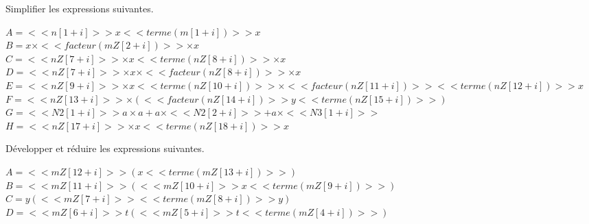\begin{multicols}{2}
\begin{center}
\medskip
{}
\end{center}


Simplifier les expressions suivantes.

\begin{multicols}{2}
$A=<<n[1+i]>> x <<terme(m[1+i])>> x$\\
$B=x\times <<facteur(mZ[2+i])>> \times x$\\
$C=<<nZ[7+i]>>\times x <<terme(nZ[8+i])>>\times x$\\
$D=<<nZ[7+i]>>\times x\times <<facteur(nZ[8+i])>>\times x$\\
$E=<<nZ[9+i]>> \times x<<terme(nZ[10+i])>>\times <<facteur(nZ[11+i])>> <<terme(nZ[12+i])>> x$\\
$F=<<nZ[13+i]>> \times (<<facteur(nZ[14+i])>>y <<terme(nZ[15+i])>>)$\\
$G=<<N2[1+i]>> a\times  a+a\times <<N2[2+i]>>+a\times <<N3[1+i]>>$\\
$H= <<nZ[17+i]>>\times x <<terme(nZ[18+i])>>x$
\end{multicols}


%
%
%


Développer et réduire les expressions suivantes.

\begin{multicols}{2}
$A=  <<mZ[12+i]>> (x  <<terme(mZ[13+i])>>)$\\
$B= <<mZ[11+i]>> ( <<mZ[10+i]>> x    <<terme(mZ[9+i])>>)$\\
$C=y( <<mZ[7+i]>>  <<terme(mZ[8+i])>> y)$\\
$D= <<mZ[6+i]>>  t(  <<mZ[5+i]>> t <<terme(mZ[4+i])>>)$
\end{multicols}


\end{multicols}
